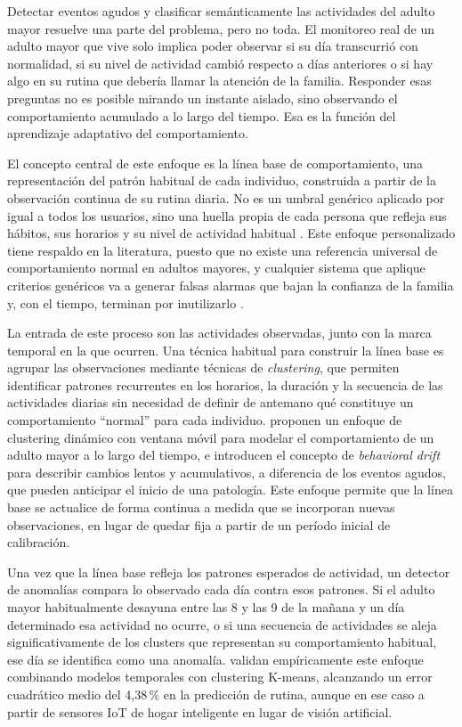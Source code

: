 Detectar eventos agudos y clasificar semánticamente las actividades del adulto mayor resuelve una parte del problema, pero no toda.
El monitoreo real de un adulto mayor que vive solo implica poder observar si su día transcurrió con normalidad, si su nivel de actividad cambió respecto a días anteriores o si hay algo en su rutina que debería llamar la atención de la familia.
Responder esas preguntas no es posible mirando un instante aislado, sino observando el comportamiento acumulado a lo largo del tiempo.
Esa es la función del aprendizaje adaptativo del comportamiento.

El concepto central de este enfoque es la línea base de comportamiento, una representación del patrón habitual de cada individuo, construida a partir de la observación continua de su rutina diaria.
No es un umbral genérico aplicado por igual a todos los usuarios, sino una huella propia de cada persona que refleja sus hábitos, sus horarios y su nivel de actividad habitual \parencite{Chifu2022}.
Este enfoque personalizado tiene respaldo en la literatura, puesto que no existe una referencia universal de comportamiento normal en adultos mayores, y cualquier sistema que aplique criterios genéricos va a generar falsas alarmas que bajan la confianza de la familia y, con el tiempo, terminan por inutilizarlo \parencite{Yahaya2021}.

La entrada de este proceso son las actividades observadas, junto con la marca temporal en la que ocurren.
Una técnica habitual para construir la línea base es agrupar las observaciones mediante técnicas de \textit{clustering}, que permiten identificar patrones recurrentes en los horarios, la duración y la secuencia de las actividades diarias sin necesidad de definir de antemano qué constituye un comportamiento ``normal'' para cada individuo.
\textcite{Snoun2024} proponen un enfoque de clustering dinámico con ventana móvil para modelar el comportamiento de un adulto mayor a lo largo del tiempo, e introducen el concepto de \textit{behavioral drift} para describir cambios lentos y acumulativos, a diferencia de los eventos agudos, que pueden anticipar el inicio de una patología.
Este enfoque permite que la línea base se actualice de forma continua a medida que se incorporan nuevas observaciones, en lugar de quedar fija a partir de un período inicial de calibración.

Una vez que la línea base refleja los patrones esperados de actividad, un detector de anomalías compara lo observado cada día contra esos patrones.
Si el adulto mayor habitualmente desayuna entre las 8 y las 9 de la mañana y un día determinado esa actividad no ocurre, o si una secuencia de actividades se aleja significativamente de los clusters que representan su comportamiento habitual, ese día se identifica como una anomalía.
\textcite{Cejudo2025} validan empíricamente este enfoque combinando modelos temporales con clustering K-means, alcanzando un error cuadrático medio del 4,38\,\% en la predicción de rutina, aunque en ese caso a partir de sensores IoT de hogar inteligente en lugar de visión artificial.

